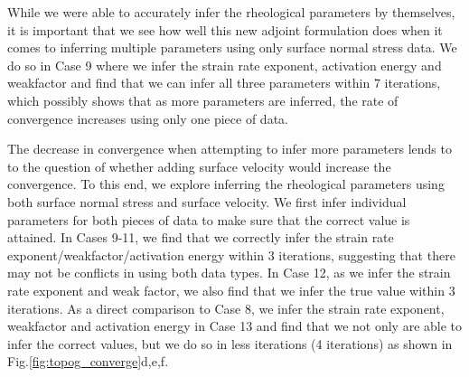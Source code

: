 \documentclass[12pt]{article}
\begin{document}
While we were able to accurately infer the rheological parameters by themselves, it is important that we see how well this new adjoint formulation does when it comes to inferring multiple parameters using only surface normal stress data. We do so in Case 9 where we  infer the strain rate exponent, activation energy and weakfactor and find that we can infer all three parameters within 7 iterations, which possibly shows that as more parameters are inferred, the rate of convergence increases using only one piece of data.


The decrease in convergence when attempting to infer more parameters lends to to the question  of whether adding surface velocity would increase the convergence. To this end, we explore inferring the rheological parameters using both surface normal stress and surface velocity. We first infer individual parameters for both pieces of data to make sure that the correct value is attained. In Cases 9-11, we find that we correctly infer the strain rate exponent/weakfactor/activation energy within 3 iterations, suggesting that there may not be conflicts in using both data types. In Case 12, as we infer the strain rate exponent and weak factor, we also find that we infer the true value within 3 iterations. As a direct comparison to Case 8, we infer the strain rate exponent, weakfactor and activation energy in Case 13 and find that we not only are able to infer the correct values, but we do so in less iterations (4 iterations) as shown in Fig.\ref{fig:topog_converge}d,e,f.
\end{document}

